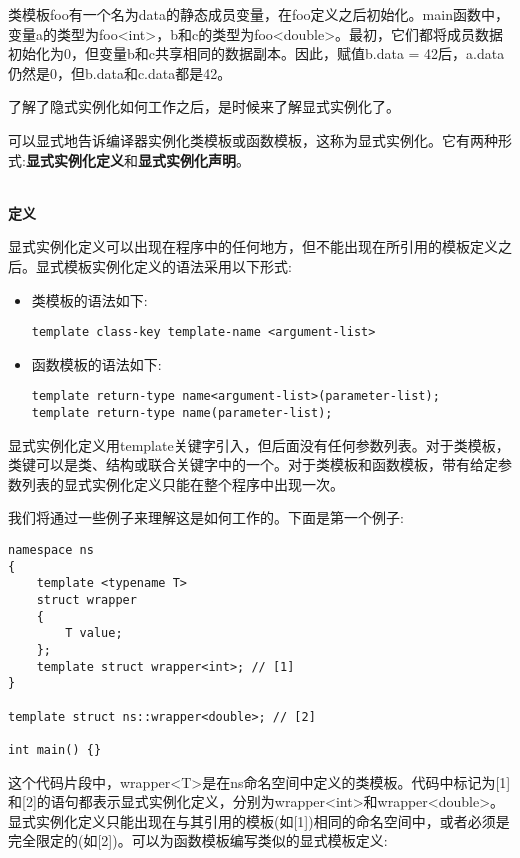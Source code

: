 类模板foo有一个名为data的静态成员变量，在foo定义之后初始化。main函数中，变量a的类型为foo<int>，b和c的类型为foo<double>。最初，它们都将成员数据初始化为0，但变量b和c共享相同的数据副本。因此，赋值b.data = 42后，a.data仍然是0，但b.data和c.data都是42。

了解了隐式实例化如何工作之后，是时候来了解显式实例化了。


可以显式地告诉编译器实例化类模板或函数模板，这称为显式实例化。它有两种形式:\textbf{显式实例化定义}和\textbf{显式实例化声明}。


\hspace*{\fill} \\ %
\noindent\textbf{定义}

显式实例化定义可以出现在程序中的任何地方，但不能出现在所引用的模板定义之后。显式模板实例化定义的语法采用以下形式:

\begin{itemize}
\item 
类模板的语法如下:
\begin{lstlisting}[style=styleCXX]
template class-key template-name <argument-list>
\end{lstlisting}

\item 
函数模板的语法如下:
\begin{lstlisting}[style=styleCXX]
template return-type name<argument-list>(parameter-list);
template return-type name(parameter-list);
\end{lstlisting}
\end{itemize}

显式实例化定义用template关键字引入，但后面没有任何参数列表。对于类模板，类键可以是类、结构或联合关键字中的一个。对于类模板和函数模板，带有给定参数列表的显式实例化定义只能在整个程序中出现一次。

我们将通过一些例子来理解这是如何工作的。下面是第一个例子:

\begin{lstlisting}[style=styleCXX]
namespace ns
{
	template <typename T>
	struct wrapper
	{
		T value;
	};
	template struct wrapper<int>; // [1]
}

template struct ns::wrapper<double>; // [2]

int main() {}
\end{lstlisting}

这个代码片段中，wrapper<T>是在ns命名空间中定义的类模板。代码中标记为[1]和[2]的语句都表示显式实例化定义，分别为wrapper<int>和wrapper<double>。显式实例化定义只能出现在与其引用的模板(如[1])相同的命名空间中，或者必须是完全限定的(如[2])。可以为函数模板编写类似的显式模板定义:


